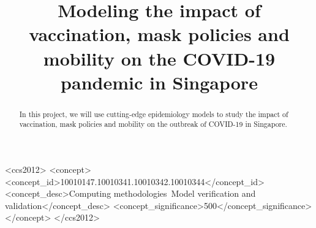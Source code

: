 \documentclass[sigconf, nonacm]{acmart}
\begin{document}
\title{Modeling the impact of vaccination, mask policies and mobility on the COVID-19 pandemic in Singapore}



\begin{abstract}
  In this project, we will use cutting-edge epidemiology models to study the impact of vaccination, mask policies and mobility on the outbreak of COVID-19 in Singapore.
\end{abstract}

\begin{CCSXML}
<ccs2012>
   <concept>
       <concept_id>10010147.10010341.10010342.10010344</concept_id>
       <concept_desc>Computing methodologies~Model verification and validation</concept_desc>
       <concept_significance>500</concept_significance>
       </concept>
 </ccs2012>
\end{CCSXML}





\maketitle
\end{document}
